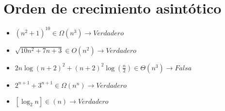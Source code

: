 \documentclass[12pt]{article}
\begin{document}
\section{Orden de crecimiento asintótico}

\begin{itemize}
  \item \((n^2 + 1)^{10} \in \Omega(n^3) \longrightarrow Verdadero\) 
  \item \(\sqrt{10n^2+7n+3} \in O(n^2) \longrightarrow Verdadero\)
  \item \(2n\log(n+2)^2+(n+2)^2\log(\frac{n}{2}) \in \Theta(n^3) \longrightarrow Falsa\)
  \item \(2^{n+1}+3^{n+1} \in \Omega(n^n) \longrightarrow Verdadero\)
  \item \([\log_2n] \in (n) \longrightarrow Verdadero\)
\end{itemize}
\end{document}
